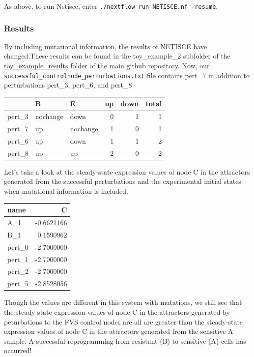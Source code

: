 \documentclass[
]{book}
\begin{document}
As above, to run Netisce, enter \texttt{./nextflow\ run\ NETISCE.nf\ -resume}.

\hypertarget{section-id}{%
\subsubsection*{Results}\label{section-id}}

By including mutational information, the results of NETISCE have changed.These results can be found in the toy\_example\_2 subfolder of the \href{https://github.com/VeraLiconaResearchGroup/Netisce/tree/main/toy_example_results}{toy\_example\_results} folder of the main github repository.
Now, our \texttt{successful\_controlnode\_perturbations.txt} file contains pert\_7 in addition to perturbations pert\_3, pert\_6, and pert\_8

\begin{tabular}{l|l|l|r|r|r}
\hline
  & B & E & up & down & total\\
\hline
pert\_3 & nochange & down & 0 & 1 & 1\\
\hline
pert\_7 & up & nochange & 1 & 0 & 1\\
\hline
pert\_6 & up & down & 1 & 1 & 2\\
\hline
pert\_8 & up & up & 2 & 0 & 2\\
\hline
\end{tabular}

Let's take a look at the steady-state expression values of node C in the attractors generated from the successful perturbations and the experimental initial states when mutational information is included.

\begin{tabular}{l|r}
\hline
name & C\\
\hline
A\_1 & -0.6621166\\
\hline
B\_1 & 0.1590962\\
\hline
pert\_0 & -2.7000000\\
\hline
pert\_1 & -2.7000000\\
\hline
pert\_2 & -2.7000000\\
\hline
pert\_5 & -2.8528056\\
\hline
\end{tabular}

Though the values are different in this system with mutations, we still see that the steady-state expression values of node C in the attractors generated by peturbations to the FVS control nodes are all are greater than the steady-state expression values of node C in the attractors generated from the sensitive A sample. A successful reprogramming from resistant (B) to sensitive (A) cells has occurred!
\end{document}
